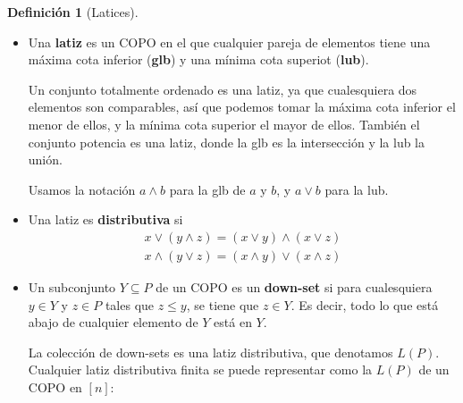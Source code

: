 \documentclass[spanish]{book}
\theoremstyle{definition}
\newtheorem*{defn}{Definición}
\begin{document}
\begin{defn}[Latices]\leavevmode
	\begin{itemize}
		\item Una \textbf{latiz} es un COPO en el que cualquier pareja de elementos tiene una máxima cota inferior (\textbf{glb}) y una mínima cota superiot (\textbf{lub}).
		
		Un conjunto totalmente ordenado es una latiz, ya que cualesquiera dos elementos son comparables, así que podemos tomar la máxima cota inferior el menor de ellos, y la mínima cota superior el mayor de ellos. También el conjunto potencia es una latiz, donde la glb es la intersección y la lub la unión.
		
		Usamos la notación $a\wedge b$ para la glb de $a$ y $b$, y $a\vee b$ para la lub.
		\item Una latiz es \textbf{distributiva} si
		\begin{align*}
			x\vee(y\wedge z)=(x\vee y)\wedge(x\vee z)\\
			x\wedge(y\vee z)=(x\wedge y)\vee(x\wedge z)
		\end{align*}
		\item Un subconjunto $Y\subseteq P$ de un COPO es un \textbf{down-set} si para cualesquiera  $y\in Y$ y $z\in P$ tales que $z\leq y$, se tiene que $z\in Y$. Es decir, todo lo que está abajo de cualquier elemento de $Y$ está en $Y$.
		
		La colección de down-sets es una latiz distributiva, que denotamos $L(P)$. Cualquier latiz distributiva finita se puede representar como la $L(P)$ de un COPO en $[n]$:
	\end{itemize}
\end{defn}
\end{document}
